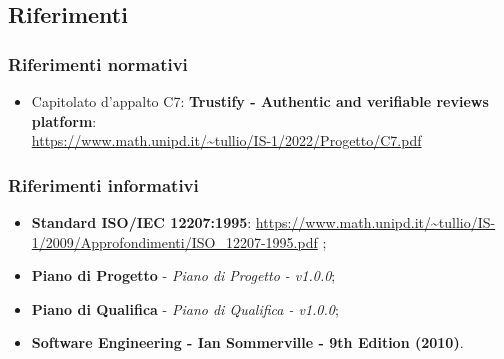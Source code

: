\subsection{Riferimenti}
\subsubsection{Riferimenti normativi}
\begin{itemize}
    \item Capitolato d'appalto C7: \textbf{Trustify - Authentic and verifiable reviews platform}: \\
          \url{https://www.math.unipd.it/~tullio/IS-1/2022/Progetto/C7.pdf}
          \hfill{}
\end{itemize}
\subsubsection{Riferimenti informativi}
\begin{itemize}
    \item \textbf{Standard ISO/IEC 12207:1995}: \url{https://www.math.unipd.it/~tullio/IS-1/2009/Approfondimenti/ISO_12207-1995.pdf} \hfill{};
    \item \textbf{Piano di Progetto} - \textit{Piano di Progetto - v1.0.0};
    \item \textbf{Piano di Qualifica} - \textit{Piano di Qualifica - v1.0.0};
    \item \textbf{Software Engineering - Ian Sommerville - 9th Edition (2010)}.
\end{itemize}
